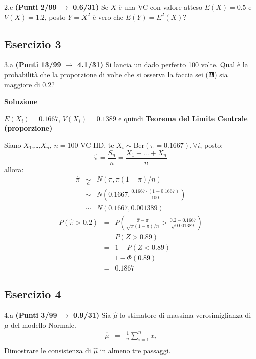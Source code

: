 \documentclass[
  11pt,
]{book}
\theoremstyle{mytheoremstyle}
\theoremstyle{mydefstyle}
\begin{document}
2.c \textbf{(Punti 2/99 \(\rightarrow\) 0.6/31)} Se \(X\) è una VC con valore atteso \(E(X)=0.5\) e \(V(X)=1.2\), posto \(Y=X^2\) è vero che \(E(Y)=E^2(X)\)?

\subsection{Esercizio 3}\label{esercizio-3-10}

3.a \textbf{(Punti 13/99 \(\rightarrow\) 4.1/31)} Si lancia un dado perfetto 100 volte. Qual è la probabilità che la proporzione di volte che si osserva la faccia sei (⚅) sia maggiore di 0.2?

\textbf{Soluzione}

\(E(X_i)=0.1667\), \(V(X_i)=0.1389\) e quindi
\textbf{Teorema del Limite Centrale (proporzione)}

Siano \(X_1\),\ldots,\(X_n\), \(n=100\) VC IID, tc \(X_i\sim\text{Ber}(\pi=0.1667)\)\(,\forall i\), posto:
\[
      \hat\pi=\frac{S_n}n = \frac{X_1 + ... + X_n}n
      \]
allora:\begin{eqnarray*}
  \hat\pi & \mathop{\sim}\limits_{a}& N(\pi,\pi(1-\pi)/n) \\
  &\sim & N\left(0.1667,\frac{0.1667\cdot(1-0.1667)}{100}\right) \\
     &\sim & N(0.1667,0.001389) 
  \end{eqnarray*}\begin{eqnarray*}
      P( \hat\pi   >   0.2 ) 
        &=& P\left(  \frac { \hat\pi  -  \pi }{ \sqrt{\pi(1-\pi)/n} }  >  \frac { 0.2  -  0.1667 }{\sqrt{ 0.001389 }} \right)  \\
                 &=& P\left(  Z   >   0.89 \right) \\    &=& 1-P(Z< 0.89 )\\ 
                 &=&  1-\Phi( 0.89 ) \\ &=&  0.1867 
      \end{eqnarray*}

\subsection{Esercizio 4}\label{esercizio-4-10}

4.a \textbf{(Punti 3/99 \(\rightarrow\) 0.9/31)} Sia \(\hat \mu\) lo stimatore di massima verosimiglianza di \(\mu\) del modello Normale.
\begin{eqnarray*}
  \hat\mu &=&  \frac 1n\sum_{i=1}^nx_i\\
\end{eqnarray*}
Dimostrare le consistenza di \(\hat\mu\) in almeno tre passaggi.
\end{document}
